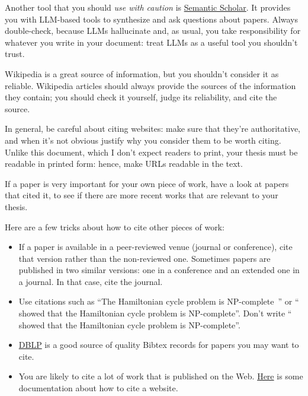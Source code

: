 Another tool that you should \emph{use with caution} is \href{https://www.semanticscholar.org/}{Semantic Scholar}. It provides you with \ac{LLM}-based tools to synthesize and ask questions about papers. Always double-check, because \acp{LLM} hallucinate and, as usual, you take responsibility for whatever you write in your document: treat \acp{LLM} as a useful tool you shouldn't trust.

Wikipedia is a great source of information, but you shouldn't consider it as reliable.
Wikipedia articles should always provide the sources of the information they contain; you
should check it yourself, judge its reliability, and cite the source.

In general, be careful about citing websites: make sure that they're authoritative, and when it's not obvious justify why you consider them to be worth citing. Unlike this document, which I don't expect readers to print, your thesis must be readable in printed form: hence, make URLs readable in the text.

If a paper is very important for your own piece of work, have a look at papers
that cited it, to see if there are more recent works that are relevant to your thesis.

Here are a few tricks about how to cite other pieces of work:
\begin{itemize}
  \item If a paper is available in a peer-reviewed venue (journal or conference), cite that
  version rather than the non-reviewed one. Sometimes papers are published in two similar
  versions: one in a conference and an extended one in a journal. In that case, cite the
  journal.
  \item Use citations such as ``The Hamiltonian cycle problem is
  NP-complete~\cite{DBLP:conf/coco/Karp72}'' or ``\textcite{DBLP:conf/coco/Karp72} showed
  that the Hamiltonian cycle problem is NP-complete''. Don't write
  ``\cite{DBLP:conf/coco/Karp72} showed that the Hamiltonian cycle problem is NP-complete''.
  \item \href{https://dblp.org}{DBLP} is a good source of quality Bibtex records for papers
  you may want to cite.
  \item You are likely to cite a lot of work that is published on the Web.
  \href{https://bibtex.eu/faq/how-can-i-use-bibtex-to-cite-a-website/}{Here} is some
  documentation about how to cite a website.
\end{itemize}
